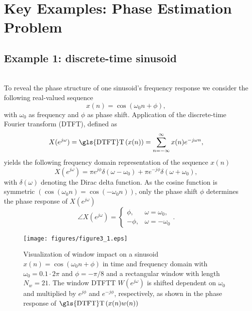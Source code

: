 \section{Key Examples: Phase Estimation Problem}\label{ch3:PE1}
\subsection{Example 1: discrete-time sinusoid}~\\
\noindent To reveal the phase structure of one sinusoid's frequency response we consider the following real-valued sequence
\begin{equation}\label{eq:c3.1}
x(n)=\cos(\omega_0n+\phi),
\end{equation}
with $\omega_0$ as frequency and $\phi$ as phase shift. Application of the discrete-time Fourier transform (\gls{DTFT}), defined as
\begin{equation}\label{eq:c3.2}
X(e^{j\omega})=\text{\gls{DTFT}T}\left(x(n)\right)=\sum_{n=-\infty}^{\infty}x(n)e^{-j\omega n},
\end{equation}
yields the following frequency domain representation of the sequence $x(n)$
\begin{equation}\label{eq:c3.3}
X(e^{j\omega})=\pi e^{j\phi}\delta(\omega-\omega_0)+\pi e^{-j\phi}\delta(\omega+\omega_0),
\end{equation}
with $\delta(\omega)$ denoting the Dirac delta function. As the cosine function is symmetric $\left(\cos(\omega_0 n)=\cos(-\omega_0 n)\right)$, only the phase shift $\phi$ determines the phase response of $X(e^{j\omega})$
\begin{equation}\label{eq:c3.4}
\angle X(e^{j\omega})=\begin{cases}\phi, & \omega=\omega_0,\\
-\phi, & \omega=-\omega_0
\end{cases}.
\end{equation}

\begin{figure}
	\center %
	\texttt{[image: figures/figure3\_1.eps]}
	\vspace{-0.6cm}
	\caption{Visualization of window impact on a sinusoid $x(n)=\cos(\omega_0 n+\phi)$ in time and frequency domain with $\omega_0=0.1\cdot2\pi$ and $\phi=-\pi/8$ and a rectangular window with length $N_w=21$. The window \gls{DTFT}T $W(e^{j\omega})$ is shifted dependent on $\omega_0$ and multiplied by $e^{j\phi}$ and $e^{-j\phi}$, respectively, as shown in the phase response of $\text{\gls{DTFT}T}\left(x(n)w(n)\right)$}\label{Figure31}
\end{figure}

